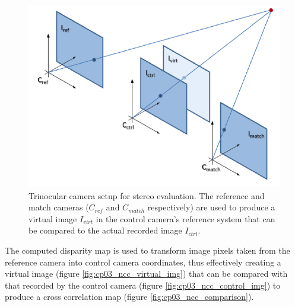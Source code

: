 \begin{figure}[h!]
\centering
\includegraphics{trinocular_setup}
\caption{Trinocular camera setup for stereo evaluation. The reference and match cameras ($C_{ref}$ and $C_{match}$ respectively) are used to produce a virtual image $I_{virt}$ in the control camera’s reference system that can be compared to the actual recorded image $I_{ctrl}$.}\label{fig:cp03_trinocular_setup}
\end{figure}
   
The computed disparity map is used to transform image pixels taken from the reference camera into control camera coordinates, thus effectively creating a virtual image (figure \ref{fig:cp03_ncc_virtual_img}) that can be compared with that recorded by the control camera (figure \ref{fig:cp03_ncc_control_img}) to produce a cross correlation map (figure \ref{fig:cp03_ncc_comparison}). 

